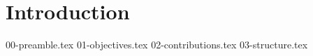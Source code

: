 
\chapter{Introduction}
\label{intro:chapter}

{00-preamble.tex}
{01-objectives.tex}
{02-contributions.tex}
{03-structure.tex}


